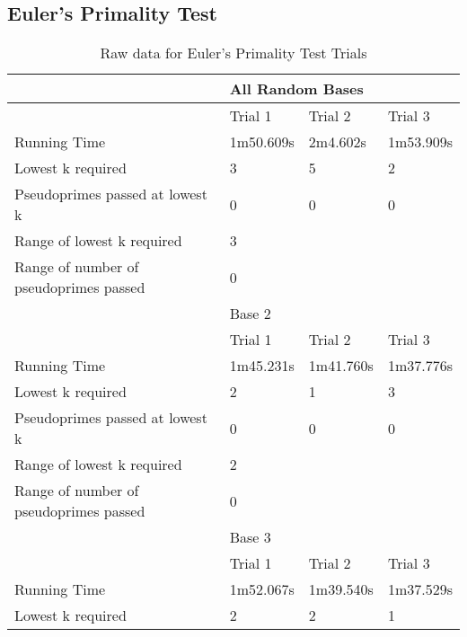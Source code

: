 \documentclass{article}
\begin{document}
\begin{appendices}
\subsection{Euler's Primality Test}
\FloatBarrier
\begin{table}[h]
\caption{Raw data for Euler's Primality Test Trials}
\label{table:euler}
\begin{tabular}{@{}llll@{}}
\toprule
                                       & \multicolumn{3}{l}{All Random Bases}  \\ \midrule
                                       & Trial 1     & Trial 2    & Trial 3    \\
Running Time                           & 1m50.609s   & 2m4.602s   & 1m53.909s  \\
Lowest k required                      & 3           & 5          & 2          \\
Pseudoprimes passed at lowest k        & 0           & 0          & 0          \\\cmidrule(lr){2-4}
Range of lowest k required             & \multicolumn{3}{l}{3}                 \\
Range of number of pseudoprimes passed & \multicolumn{3}{l}{0}                 \\\midrule
                                       & \multicolumn{3}{l}{Base 2}            \\\midrule
                                       & Trial 1     & Trial 2    & Trial 3    \\
Running Time                           & 1m45.231s   & 1m41.760s  & 1m37.776s  \\
Lowest k required                      & 2           & 1          & 3          \\
Pseudoprimes passed at lowest k        & 0           & 0          & 0          \\\cmidrule(lr){2-4}
Range of lowest k required             & \multicolumn{3}{l}{2}                 \\
Range of number of pseudoprimes passed & \multicolumn{3}{l}{0}                 \\\midrule
                                       & \multicolumn{3}{l}{Base 3}            \\\midrule
                                       & Trial 1     & Trial 2    & Trial 3    \\
Running Time                           & 1m52.067s   & 1m39.540s  & 1m37.529s  \\
Lowest k required                      & 2           & 2          & 1          \\

\end{tabular}
\end{table}
\end{appendices}
\end{document}
